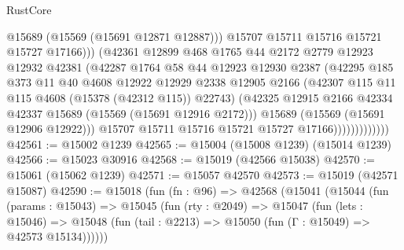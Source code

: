 \begin{lexlean}{RustCore}
\begin{coremodule}
                                  @15689
                                  (@15569 (@15691 @12871 @12887)))
                                @15707
                                @15711
                                @15716
                                @15721
                                @15727
                                @17166)))
                          (@42361
                            @12899
                            @468
                            @1765
                            @44
                            @2172
                            @2779
                            @12923
                            @12932
                            @42381
                            (@42287
                              @1764
                              @58
                              @44
                              @12923
                              @12930
                              @2387
                              (@42295
                                @185
                                @373
                                @11
                                @40
                                @4608
                                @12922
                                @12929
                                @2338
                                @12905
                                @2166
                                (@42307 @115 @11 @115 @4608 (@15378 (@42312 @115)) @22743)
                                (@42325
                                  @12915
                                  @2166
                                  @42334
                                  @42337
                                  @15689
                                  (@15569 (@15691 @12916 @2172)))
                                @15689
                                (@15569 (@15691 @12906 @12922)))
                              @15707
                              @15711
                              @15716
                              @15721
                              @15727
                              @17166)))))))))))))
@42561 := @15002 @1239
@42565 := @15004 (@15008 @1239) (@15014 @1239)
@42566 := @15023 @30916
@42568 := @15019 (@42566 @15038)
@42570 := @15061 (@15062 @1239)
@42571 := @15057 @42570
@42573 := @15019 (@42571 @15087)
@42590 := @15018
    (fun (fn : @96) =>
    @42568
      (@15041
        (@15044
          (fun (params : @15043) =>
          @15045
            (fun (rty : @2049) =>
            @15047
              (fun (lets : @15046) =>
              @15048 (fun (tail : @2213) => @15050 (fun (Γ : @15049) => @42573 @15134))))))

\end{coremodule}
\end{lexlean}
